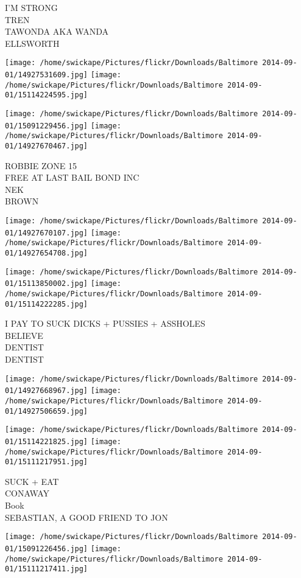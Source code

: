 \documentclass[10pt,letterpaper]{article}
\begin{document}
I'M STRONG\\
TREN\\
TAWONDA AKA WANDA\\
ELLSWORTH
\pagebreak

\texttt{[image: /home/swickape/Pictures/flickr/Downloads/Baltimore 2014-09-01/14927531609.jpg]}
\texttt{[image: /home/swickape/Pictures/flickr/Downloads/Baltimore 2014-09-01/15114224595.jpg]}

\texttt{[image: /home/swickape/Pictures/flickr/Downloads/Baltimore 2014-09-01/15091229456.jpg]}
\texttt{[image: /home/swickape/Pictures/flickr/Downloads/Baltimore 2014-09-01/14927670467.jpg]}

ROBBIE ZONE 15\\
FREE AT LAST BAIL BOND INC\\
NEK\\
BROWN
\pagebreak

\texttt{[image: /home/swickape/Pictures/flickr/Downloads/Baltimore 2014-09-01/14927670107.jpg]}
\texttt{[image: /home/swickape/Pictures/flickr/Downloads/Baltimore 2014-09-01/14927654708.jpg]}

\texttt{[image: /home/swickape/Pictures/flickr/Downloads/Baltimore 2014-09-01/15113850002.jpg]}
\texttt{[image: /home/swickape/Pictures/flickr/Downloads/Baltimore 2014-09-01/15114222285.jpg]}

I PAY TO SUCK DICKS + PUSSIES + ASSHOLES\\
BELIEVE\\
DENTIST\\
DENTIST
\pagebreak

\texttt{[image: /home/swickape/Pictures/flickr/Downloads/Baltimore 2014-09-01/14927668967.jpg]}
\texttt{[image: /home/swickape/Pictures/flickr/Downloads/Baltimore 2014-09-01/14927506659.jpg]}

\texttt{[image: /home/swickape/Pictures/flickr/Downloads/Baltimore 2014-09-01/15114221825.jpg]}
\texttt{[image: /home/swickape/Pictures/flickr/Downloads/Baltimore 2014-09-01/15111217951.jpg]}

SUCK + EAT\\
CONAWAY\\
Book\\
SEBASTIAN, A GOOD FRIEND TO JON
\pagebreak

\texttt{[image: /home/swickape/Pictures/flickr/Downloads/Baltimore 2014-09-01/15091226456.jpg]}
\texttt{[image: /home/swickape/Pictures/flickr/Downloads/Baltimore 2014-09-01/15111217411.jpg]}
\end{document}
